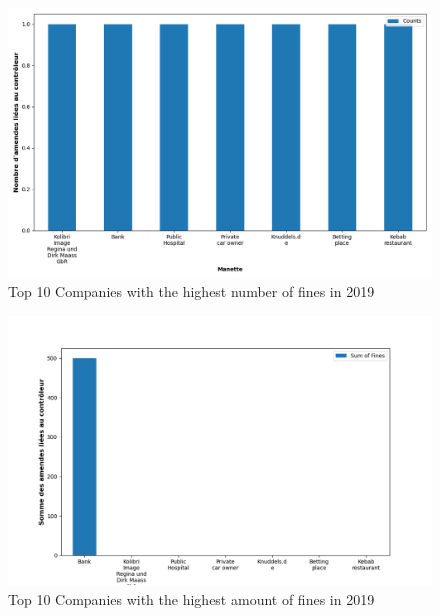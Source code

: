 \documentclass[12pt]{article}
\begin{document}
\newpage

	
	\begin{multicols}{2}
	\begin{figure}
		[H]\centering\includegraphics[width=1.0\linewidth]{graphs/top10_controller_year}
		\caption{Top 10 Companies with the highest number of fines in 2019}
	\end{figure}
	\begin{figure}
		[H]\centering\includegraphics[width=1\linewidth]{graphs/top10_controller_year_fines}
		\caption{Top 10 Companies with the highest  amount of fines in 2019}
	 \end{figure}
	
	\end{multicols}
\end{document}
